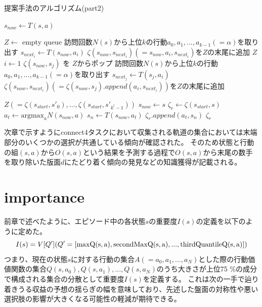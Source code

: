\begin{algorithm}
    \caption{提案手法のアルゴリズム(part2)}
    \begin{algorithmic}[1]       
           \State $s_{now} \gets T(s, a)$
           
           \State $Z \gets $ empty queue
           \State 訪問回数$N(s)$から上位$k$の行動${a_0, a_1, ..., a_{k-1}}(=\alpha)$を取り出す
             \State $s_{{next}_i} \gets T(s_{now}, a_i)$
             \State $\zeta(s_{now},s_{{next}_i})(={s_{now}, a_i, s_{{next}_i}})$を$Z$の末尾に追加
           \EndFor
             \Return $Z$
           \EndIf
           \State $i \gets 1$
                    \State $\zeta(s_{now}, s_{j})$ を $Z$からポップ
                    \State 訪問回数$N(s)$から上位$k$の行動${a_0, a_1, ..., a_{k-1}}(=\alpha)$を取り出す
                        \State $s_{{next}_j} \gets T(s_{j}, a_i)$
                        \State $\zeta(s_{now},s_{{next}_i})(=\zeta(s_{now}, s_{j}).append({a_i, s_{{next}_i}}))$を$Z$の末尾に追加
                    \EndFor
                    
                \EndFor     
           \EndWhile
           \Return $Z(={\zeta(s_{start}, {s'}_0), ..., \zeta(s_{start}, {s'}_{k^l-1})})$
        \EndFunction
        \State $s_{now} \gets s$
        \State $\zeta_r \gets \zeta(s_{start}, s)$
            \State $a_t \gets \textrm{argmax}_a N(s_{now}, a)$
            \State $s_n \gets T(s_{now}, a_t)$
            \State $\zeta_r.append({a_t, s_n})$
        \EndWhile
        \Return $\zeta_r$
        \EndFunction
       
        
    \end{algorithmic}
\end{algorithm}


次章で示すようにconnect4タスクにおいて収集される軌道の集合においては末端部分のいくつかの選択が共通している傾向が確認された。
そのため状態と行動の組$(s, a)$から$O(s, a)$という結果を予測する過程で$O(s, a)$から末尾の数手を取り除いた版面$d$にたどり着く傾向の発見などの知識獲得が記載される。
\section{importance}
前章で述べたように、エピソード中の各状態$s$の重要度$I(s)$の定義を以下のように定めた。
\begin{equation}
	{I(s)=V[Q'] (Q'=[\rm{max}Q(s, a), \rm{secondMax}Q(s, a), ..., \rm{thirdQuantile}Q(s, a)])}
\end{equation}
つまり、現在の状態$s$に対する行動の集合$A(={a_0, a_1, ..., a_N})$とした際の行動価値関数の集合${Q(s, a_0), Q(s, a_1), ..., Q(s, a_N)}$のうち大きさが上位75
\%の成分で構成される集合の分散として重要度$I(s)$を定義する。
これは次の一手で辿り着きうる収益の予想の揺らぎの幅を意味しており、先述した盤面の対称性や悪い選択肢の影響が大きくなる可能性の軽減が期待できる。


